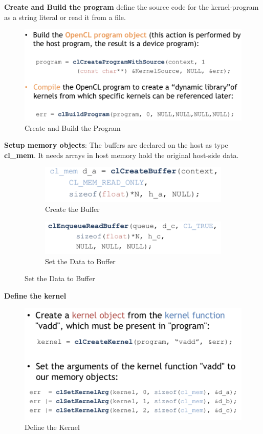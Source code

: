 \documentclass{article}
\begin{document}
\textbf{Create and Build the program} define the source code for the kernel-program as a string literal or read it from a file.

\begin{figure}[h]
    \centering
    \includegraphics[width=0.8\linewidth]{images/create-and-build-the-program.png}
    \caption{Create and Build the Program}
    \label{fig:my_label}
\end{figure}


\textbf{Setup memory objects}: The buffers are declared on the host as type \textbf{cl\_mem}. It needs arrays in host memory hold the original host-side data.



\begin{figure}[h]
    \centering
    \begin{subfigure}{0.45\textwidth}
    \includegraphics[scale=0.5]{images/create-the-buffer.png}
    \caption{Create the Buffer}
    \label{fig:my_label}
    \end{subfigure}
    \begin{subfigure}{0.45\textwidth}
    \includegraphics[scale=0.5]{images/set-the-data-to-buffer.png}
    \caption{Set the Data to Buffer}
    \label{fig:my_label}
    \end{subfigure}
\end{figure}


\textbf{Define the kernel}

\begin{figure}[h]
    \centering
    \includegraphics[width=0.8\linewidth]{images/define-the-kernel.png}
    \caption{Define the Kernel}
    \label{fig:my_label}
\end{figure}
\end{document}

